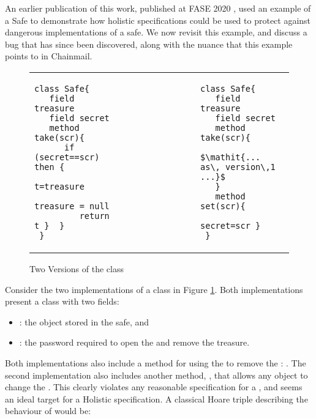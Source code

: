 An earlier publication of this work, published at FASE 2020 \cite{FASE}, used an example of a Safe to
demonstrate how holistic specifications could be used to protect against dangerous implementations
of a safe. We now revisit this example, and discuss a bug that has since been discovered, along with
the nuance that this example points to in Chainmail. 

 \begin{figure}[htb]
 \begin{tabular}{lll} %
\begin{minipage}{0.45\textwidth}
\begin{lstlisting}
class Safe{
   field treasure 
   field secret 
   method take(scr){
      if (secret==scr) then {
         t=treasure
         treasure = null
         return t }  }
 }
\end{lstlisting}
\end{minipage}
  &\ \ \  \ \ \ \ \  \ \ \ \ \ \ &
\begin{minipage}{0.45\textwidth}
\begin{lstlisting}
class Safe{
   field treasure   
   field secret  
   method take(scr){
       $\mathit{... as\, version\,1 ...}$ 
   }
   method set(scr){
         secret=scr }
 }
\end{lstlisting}
\end{minipage} 
 \end{tabular}
  \vspace*{-0.95cm}
  \caption{Two Versions of the class }
 \label{fig:ExampleSafe}
 \vspace*{-0.65cm}
 \end{figure}

Consider the two implementations of a  class in Figure \ref{fig:ExampleSafe}. Both implementations 
present a class with two fields:
\begin{itemize}
\item
{} : the object stored in the safe,  and 
\item
{} : the password required to open the  and remove the treasure.
\end{itemize}
Both implementations also include a method for using the 
  to remove the : .
The second implementation also includes another method, , that allows any object to change the .
This clearly violates any reasonable specification for a , and seems an ideal target for a Holistic specification.
 A classical Hoare triple describing the behaviour of  would be:
 
